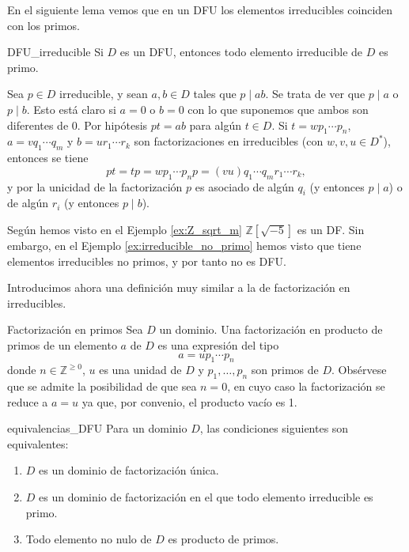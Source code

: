 En el siguiente lema vemos que en un DFU los elementos irreducibles coinciden con los primos.

\begin{lemma}{}{DFU_irreducible}
Si \(D\) es un DFU, entonces todo elemento irreducible de \(D\) es primo.
\end{lemma}

\begin{proofbox}
Sea \(p \in D\) irreducible, y sean \(a, b \in D\) tales que \(p \mid ab\). Se trata de ver que \(p \mid a\) o \(p \mid b\). Esto está claro si \(a = 0\) o \(b = 0\) con lo que suponemos que ambos son diferentes de 0. Por hipótesis \(pt = ab\) para algún \(t \in D\). Si \(t = w p_1 \cdots p_n\), \(a = v q_1 \cdots q_m\) y \(b = u r_1 \cdots r_k\) son factorizaciones en irreducibles (con \(w, v, u \in D^*\)), entonces se tiene
\[
pt = tp = w p_1 \cdots p_n p  = (vu) q_1 \cdots q_m r_1 \cdots r_k,
\]
y por la unicidad de la factorización \(p\) es asociado de algún \(q_i\) (y entonces \(p \mid a\)) o de algún \(r_i\) (y entonces \(p \mid b\)).
\end{proofbox}

Según hemos visto en el Ejemplo \ref{ex:Z_sqrt_m} \(\mathbb{Z}[\sqrt{-5}]\) es un DF. Sin embargo, en el Ejemplo \ref{ex:irreducible_no_primo} hemos visto que tiene elementos irreducibles no primos, y por tanto no es DFU.

Introducimos ahora una definición muy similar a la de factorización en irreducibles.
\begin{definition}{Factorización en primos}{}
Sea \(D\) un dominio. Una factorización en producto de primos de un elemento \(a\) de \(D\) es una expresión del tipo
\[
a = u p_1 \cdots p_n
\]
donde \(n \in \mathbb{Z}^{\geq 0}\), \(u\) es una unidad de \(D\) y \(p_1, \ldots, p_n\) son primos de \(D\). Obsérvese que se admite la posibilidad de que sea $n = 0$, en cuyo caso la factorización se reduce a $a = u$ ya que, por convenio, el producto vacío es 1.
\end{definition}

\begin{proposition}{}{equivalencias_DFU}
Para un dominio \(D\), las condiciones siguientes son equivalentes:

\begin{enumerate}
\item \(D\) es un dominio de factorización única.

\item \(D\) es un dominio de factorización en el que todo elemento irreducible es primo.

\item Todo elemento no nulo de \(D\) es producto de primos.
\end{enumerate}

\end{proposition}

